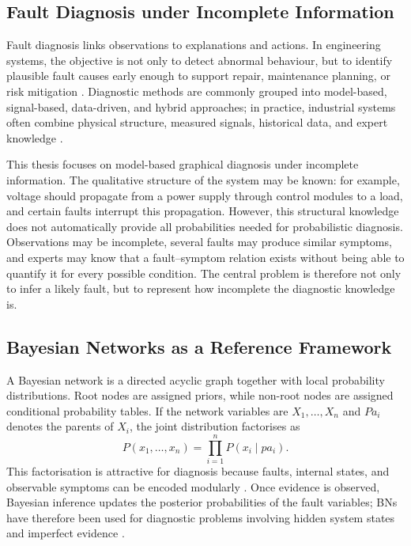 \documentclass[runningheads]{llncs}
\begin{document}
\subsection{Fault Diagnosis under Incomplete Information}
\label{sec:fault_diagnosis_uncertainty}

Fault diagnosis links observations to explanations and actions. In engineering systems, the objective is not only to detect abnormal behaviour, but to identify plausible fault causes early enough to support repair, maintenance planning, or risk mitigation \cite{Isermann2006,Venkatasubramanian2003PartI}. Diagnostic methods are commonly grouped into model-based, signal-based, data-driven, and hybrid approaches; in practice, industrial systems often combine physical structure, measured signals, historical data, and expert knowledge \cite{Venkatasubramanian2003PartI,Venkatasubramanian2003PartII,Venkatasubramanian2003PartIII,GaoCecatiDing2015PartII}.

This thesis focuses on model-based graphical diagnosis under incomplete information. The qualitative structure of the system may be known: for example, voltage should propagate from a power supply through control modules to a load, and certain faults interrupt this propagation. However, this structural knowledge does not automatically provide all probabilities needed for probabilistic diagnosis. Observations may be incomplete, several faults may produce similar symptoms, and experts may know that a fault--symptom relation exists without being able to quantify it for every possible condition. The central problem is therefore not only to infer a likely fault, but to represent how incomplete the diagnostic knowledge is.


\subsection{Bayesian Networks as a Reference Framework}
\label{sec:bayesian_networks_reference}

A Bayesian network is a directed acyclic graph together with local probability distributions. Root nodes are assigned priors, while non-root nodes are assigned conditional probability tables. If the network variables are $X_1,\ldots,X_n$ and $Pa_i$ denotes the parents of $X_i$, the joint distribution factorises as
\begin{equation}
P(x_1,\ldots,x_n)=\prod_{i=1}^{n}P(x_i\mid pa_i).
\end{equation}
This factorisation is attractive for diagnosis because faults, internal states, and observable symptoms can be encoded modularly \cite{Pearl1988,Heckerman1995}. Once evidence is observed, Bayesian inference updates the posterior probabilities of the fault variables; BNs have therefore been used for diagnostic problems involving hidden system states and imperfect evidence \cite{LernerParrKollerBiswas2000,VerbertBabuskaDeSchutter2017}.
\end{document}
